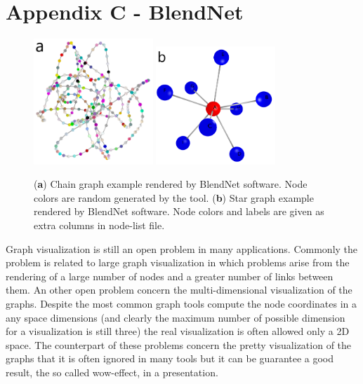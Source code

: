 \documentclass{standalone}
\begin{document}
\chapter*{Appendix C - BlendNet}


\begin{figure}[htbp]
\centering
\includegraphics[width=0.4\textwidth]{./img/cycle_graph.png}
\qquad\qquad
\includegraphics[width=0.4\textwidth]{./img/star_graph_node.png}
\caption{(\textbf{a}) Chain graph example rendered by BlendNet software.
Node colors are random generated by the tool.
(\textbf{b}) Star graph example rendered by BlendNet software.
Node colors and labels are given as extra columns in node-list file.
}
\label{fig:blendnet}
\end{figure}

Graph visualization is still an open problem in many applications.
Commonly the problem is related to large graph visualization in which problems arise from the rendering of a large number of nodes and a greater number of links between them.
An other open problem concern the multi-dimensional visualization of the graphs.
Despite the most common graph tools compute the node coordinates in a any space dimensions (and clearly the maximum number of possible dimension for a visualization is still three) the real visualization is often allowed only a 2D space.
The counterpart of these problems concern the pretty visualization of the graphs that it is often ignored in many tools but it can be guarantee a good result, the so called wow-effect, in a presentation.
\end{document}
